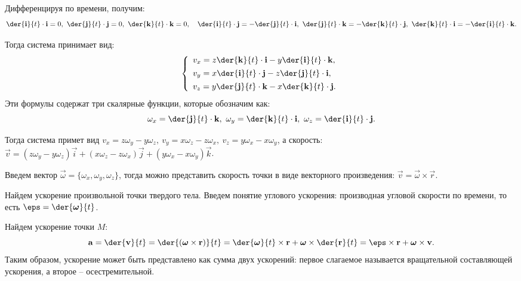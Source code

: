 Дифференцируя по времени, получим:
\[
    \der{\vec{i}}{t}\cdot\vec{i} = 0,\ \der{\vec{j}}{t}\cdot\vec{j} = 0,\ 
    \der{\vec{k}}{t}\cdot\vec{k} = 0, \quad 
    \der{\vec{i}}{t}\cdot\vec{j} = -\der{\vec{j}}{t}\cdot\vec{i},\ 
    \der{\vec{j}}{t}\cdot\vec{k} = -\der{\vec{k}}{t}\cdot\vec{j},\ 
    \der{\vec{k}}{t}\cdot\vec{i} = -\der{\vec{i}}{t}\cdot\vec{k}.
\]

Тогда система принимает вид:
\[
    \left\{ \begin{array}{l}
        \ds v_x = z\der{\vec{k}}{t}\cdot\vec{i} - y\der{\vec{i}}{t}\cdot\vec{k},
        \\[.4em]
        \ds v_y = x\der{\vec{i}}{t}\cdot\vec{j} - z\der{\vec{j}}{t}\cdot\vec{i},
        \\[.4em]
        \ds v_z = y\der{\vec{j}}{t}\cdot\vec{k} - x\der{\vec{k}}{t}\cdot\vec{j}.
    \end{array} \right.
\]
Эти формулы содержат три скалярные функции, которые обозначим как:
\[
    \omega_x = \der{\vec{j}}{t}\cdot\vec{k},\ \omega_y =
    \der{\vec{k}}{t}\cdot\vec{i},\ \omega_z = \der{\vec{i}}{t}\cdot\vec{j}.
\]

Тогда система примет вид \( v_x = z\omega_y - y\omega_z,\ v_y = x\omega_z -
z\omega_x,\ v_z = y\omega_x - x\omega_y \), а скорость: \( \vec{v} =
(z\omega_y - y\omega_z)\vec{i} + (x\omega_z - z\omega_x)\vec{j} +
(y\omega_x - x\omega_y)\vec{k} \).

Введем вектор \( \vec{\omega} = \{\omega_x, \omega_y, \omega_z\} \), тогда можно
представить скорость точки в виде векторного произведения:
\( \vec{v} = \vec{\omega}\times\vec{r} \).

Найдем ускорение произвольной точки твердого тела. Введем понятие углового
ускорения: производная угловой скорости по времени, то есть
\( \ds \vec{\eps} = \der{\vec{\omega}}{t} \).

Найдем ускорение точки \( M \):
\[
    \vec{a} = \der{\vec{v}}{t} = \der{(\vec{\omega}\times\vec{r})}{t} =
    \der{\vec{\omega}}{t}\times\vec{r} + \vec{\omega}\times\der{\vec{r}}{t} =
    \vec{\eps}\times\vec{r} + \vec{\omega}\times\vec{v}.
\]
Таким образом, ускорение может быть представлено как сумма двух ускорений:
первое слагаемое называется вращательной составляющей ускорения, а второе --
осестремительной.

\newpage
